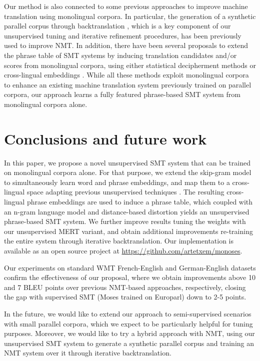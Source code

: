 \documentclass[11pt,a4paper]{article}
\begin{document}
Our method is also connected to some previous approaches to improve machine translation using monolingual corpora. In particular, the generation of a synthetic parallel corpus through backtranslation \citep{sennrich2016improving}, which is a key component of our unsupervised tuning and iterative refinement procedures, has been previously used to improve NMT. In addition, there have been several proposals to extend the phrase table of SMT systems by inducing translation candidates and/or scores from monolingual corpora, using either statistical decipherment methods \citep{dou2012large,dou2013dependency} or cross-lingual embeddings \citep{zhao2015learning,wang2016bilingual}. While all these methods exploit monolingual corpora to enhance an existing machine translation system previously trained on parallel corpora, our approach learns a fully featured phrase-based SMT system from monolingual corpora alone.


\section{Conclusions and future work} \label{sec:conclusions}

In this paper, we propose a novel unsupervised SMT system that can be trained on monolingual corpora alone. For that purpose, we extend the skip-gram model \citep{mikolov2013distributed} to simultaneously learn word and phrase embeddings, and map them to a cross-lingual space adapting previous unsupervised techniques \citep{artetxe2018robust}. The resulting cross-lingual phrase embeddings are used to induce a phrase table, which coupled with an n-gram language model and distance-based distortion yields an unsupervised phrase-based SMT system. We further improve results tuning the weights with our unsupervised MERT variant, and obtain additional improvements re-training the entire system through iterative backtranslation. Our implementation is available as an open source project at \url{https://github.com/artetxem/monoses}.

Our experiments on standard WMT French-English and German-English datasets confirm the effectiveness of our proposal, where we obtain improvements above 10 and 7 BLEU points over previous NMT-based approaches, respectively, closing the gap with supervised SMT (Moses trained on Europarl) down to 2-5 points.

In the future, we would like to extend our approach to semi-supervised scenarios with small parallel corpora, which we expect to be particularly helpful for tuning purposes. Moreover, we would like to try a hybrid approach with NMT, using our unsupervised SMT system to generate a synthetic parallel corpus and training an NMT system over it through iterative backtranslation.
\end{document}
